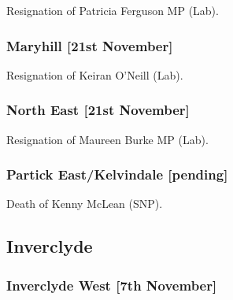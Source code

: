\documentclass[a4paper,openany]{book}
\begin{document}
\begin{resultsiii}

Resignation of Patricia Ferguson MP (Lab).

\subsubsection*{Maryhill \hspace*{\fill}\nolinebreak[1]%
	\enspace\hspace*{\fill}
	[21st November]}


Resignation of Keiran O'Neill (Lab).

\subsubsection*{North East \hspace*{\fill}\nolinebreak[1]%
	\enspace\hspace*{\fill}
	[21st November]}


Resignation of Maureen Burke MP (Lab).

\subsubsection*{Partick East\slash Kelvindale \hspace*{\fill}\nolinebreak[1]%
	\enspace\hspace*{\fill}
	[pending]}


Death of Kenny McLean (SNP).

\subsection*{Inverclyde}

\subsubsection*{Inverclyde West \hspace*{\fill}\nolinebreak[1]%
	\enspace\hspace*{\fill}
	[7th November]}


\end{resultsiii}
\end{document}
